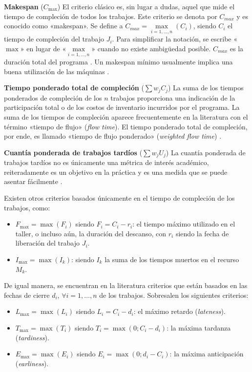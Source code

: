 \documentclass[spanish,draft,12pt,headsepline,footsepline,paper=letter]{scrreprt}
\begin{document}
\textbf{Makespan} ($C_{\max}$) El criterio clásico es, sin lugar a dudas, aquel que mide el tiempo de compleción de todos los trabajos. Este criterio se denota por $C_{max}$ y es conocido como «makespan». Se define a $C_{max} = \underset{i=1,\dots,n}{\max}(C_i)$, siendo $C_i$ el tiempo de compleción del trabajo $J_i$. Para simplificar la notación, se escribe «$\max$» en lugar de «$\underset{i=1,\dots,n}{\max}$» cuando no existe ambigüedad posible. $C_{max}$ es la duración total del programa \citep[p.~13]{TKindt2002}. Un makespan mínimo usualmente implica una buena utilización de las máquinas \citep[p.~18]{Pinedo1995}.

\textbf{Tiempo ponderado total de compleción} ($\sum w_jC_j$) La suma de los tiempos ponderados de compleción de los $n$ trabajos proporciona una indicación de la participación total o de los costos de inventario incurridos por el programa. La suma de los tiempos de compleción aparece frecuentemente en la literatura con el término «tiempo de flujo» (\textit{flow time}). El tiempo ponderado total de compleción, por ende, es llamado «tiempo de flujo ponderado» (\textit{weighted flow time}) \citep[p.~18]{Pinedo1995}.

\textbf{Cuantía ponderada de trabajos tardíos} ($\sum w_jU_j$) 
La cuantía ponderada de trabajos tardíos no es únicamente una métrica de interés académico, reiteradamente es un objetivo en la práctica y es una medida que se puede asentar fácilmente \citep[p.~19]{Pinedo1995}.

Existen otros criterios basados únicamente en el tiempo de compleción de los trabajos, como:

\begin{itemize}
\item$F_{\max} = \max(F_i)$ siendo $F_i = C_i - r_i$: el tiempo máximo utilizado en el taller, o incluso aún, la duración del descanso, con $r_i$ siendo la fecha de liberación del trabajo $J_i$.
\item$I_{\max} = \max(I_k)$: siendo $I_k$ la suma de los tiempos muertos en el recurso $M_k$.
\end{itemize}

De igual manera, se encuentran en la literatura criterios que están basados en las fechas de cierre $d_i$, $\forall i = 1,\dots,n$ de los trabajos. Sobresalen los siguientes criterios:

\begin{itemize}
  \item $L_{\max} = \max(L_i)$ siendo $L_i = C_i - d_i$: el máximo retardo (\textit{lateness}).
  \item $T_{\max} = \max(T_i)$ siendo $T_i = \max(0; C_i - d_i)$: la máxima tardanza (\textit{tardiness}).
  \item $E_{\max} = \max(E_i)$ siendo $E_i = \max(0; d_i - C_i)$: la máxima anticipación (\textit{earliness}).
\end{itemize}
\end{document}
